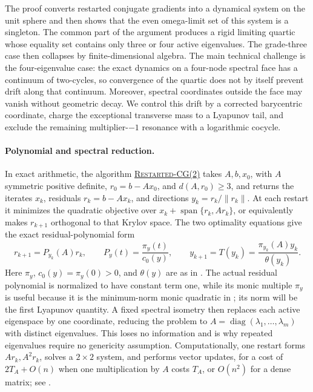 \documentclass[11pt]{article}
\begin{document}
The proof converts restarted conjugate gradients into a dynamical system on
the unit sphere and then shows that the even omega-limit set of this system
is a singleton.  The common part of the argument produces a rigid limiting
quartic whose equality set contains only three or four active eigenvalues.
The grade-three case then collapses by finite-dimensional algebra.  The
main technical challenge is the four-eigenvalue case: the exact dynamics on
a four-node spectral face has a continuum of two-cycles, so convergence of
the quartic does not by itself prevent drift along that continuum.  Moreover,
spectral coordinates outside the face may vanish without geometric decay.
We control this drift by a corrected barycentric coordinate, charge the
exceptional transverse mass to a Lyapunov tail, and exclude the remaining
multiplier-\(-1\) resonance with a logarithmic cocycle.

\paragraph{Polynomial and spectral reduction.}
In exact arithmetic, the algorithm
\hyperref[alg:restarted-cg2]{\textsc{Restarted-CG(2)}} takes
\(A,b,x_0\), with \(A\) symmetric positive definite,
\(r_0=b-Ax_0\), and \(d(A,r_0)\geq3\), and returns the iterates \(x_k\),
residuals \(r_k=b-Ax_k\), and directions
\(y_k=r_k/\lVert r_k\rVert\).
At each restart it minimizes the quadratic objective over
\(x_k+\operatorname{span}\{r_k,Ar_k\}\), or equivalently makes
\(r_{k+1}\) orthogonal to that Krylov space.  The two optimality equations
give the exact residual-polynomial form
\[
 r_{k+1}=P_{y_k}(A)r_k,\qquad
 P_y(t)=\frac{\pi_y(t)}{c_0(y)},\qquad
 y_{k+1}=T(y_k)=\frac{\pi_{y_k}(A)y_k}{\theta(y_k)}.
\]
Here \(\pi_y\), \(c_0(y)=\pi_y(0)>0\), and \(\theta(y)\) are as in
.  The actual residual polynomial is normalized to have
constant term one, while its monic multiple \(\pi_y\) is useful because it
is the minimum-norm monic quadratic in ; its
norm will be the first Lyapunov quantity.  A fixed spectral isometry then
replaces each active eigenspace by one coordinate, reducing the problem to
\(A=\operatorname{diag}(\lambda_1,\ldots,\lambda_m)\) with distinct
eigenvalues.  This loses no information and is why repeated eigenvalues
require no genericity assumption.  Computationally, one restart forms
\(Ar_k,A^2r_k\), solves a \(2\times2\) system, and performs vector updates,
for a cost of \(2T_A+O(n)\) when one multiplication by \(A\) costs
\(T_A\), or \(O(n^2)\) for a dense matrix; see
.
\end{document}
